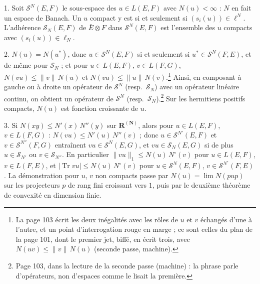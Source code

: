 \documentclass[11pt,a4paper]{article}
\begin{document}
1. Soit $\mathcal{S}^N(E,F)$ le sous-espace des $u \in L(E,F)$ avec $N(u) <
\infty$ : $N$ en fait un espace de Banach. Un $u$ compact y est si et
seulement si $(s_i(u)) \in \ell^N$. L'adhérence $\mathcal{S}_N(E,F)$ de
$\bar{E} \otimes F$ dans $\mathcal{S}^N(E,F)$ est l'ensemble des $u$ compacts
avec $(s_i(u)) \in \ell_N$.

2. $N(u) = N(u^{*})$, donc $u \in \mathcal{S}^N(E,F)$ si et seulement si
$u^{*} \in \mathcal{S}^N(F,E)$, et de même pour $\mathcal{S}_N$ ; et pour
$u \in L(E,F)$, $v \in L(F,G)$, $N(vu) \leq \|v\|\,N(u)$ et $N(vu) \leq
\|u\|\,N(v)$.\footnote{La page 103 écrit les deux inégalités avec les rôles
de $u$ et $v$ échangés d'une à l'autre, et un point d'interrogation rouge en
marge ; ce sont celles du plan de la page 101, dont le premier jet, biffé,
en écrit trois, avec $N(uv) \leq \|v\|\,N(u)$ (seconde passe, machine).}
Ainsi, en composant à gauche ou à droite un opérateur de
$\mathcal{S}^N$ (resp.\ $\mathcal{S}_N$) avec un opérateur linéaire continu,
on obtient un opérateur de $\mathcal{S}^N$ (resp.\ $\mathcal{S}_N$).\footnote{Page
103, dans la lecture de la seconde passe (machine) : la phrase parle
d'opérateurs, non d'espaces comme le lisait la première.} Sur les
hermitiens positifs compacts, $N(u)$ est fonction croissante de $u$.

3. Si $N(xy) \leq N'(x)\,N''(y)$ sur $\mathbf{R}^{(\mathbf{N})}$, alors pour
$u \in L(E,F)$, $v \in L(F,G)$ : $N(vu) \leq N'(u)\,N''(v)$ ; donc $u \in
\mathcal{S}^{N'}(E,F)$ et $v \in \mathcal{S}^{N''}(F,G)$ entraînent $vu \in
\mathcal{S}^N(E,G)$, et $vu \in \mathcal{S}_N(E,G)$ si de plus $u \in
\mathcal{S}_{N'}$ ou $v \in \mathcal{S}_{N''}$. En particulier $\|vu\|_1 \leq
N(u)\,N^{\circ}(v)$ pour $u \in L(E,F)$, $v \in L(F,E)$, et $|\operatorname{Tr}
vu| \leq N(u)\,N^{\circ}(v)$ pour $u \in \mathcal{S}^N(E,F)$, $v \in
\mathcal{S}^{N^{\circ}}(F,E)$. La démonstration pour $u$, $v$ non compacts
passe par $N(u) = \lim N(pup)$ sur les projecteurs $p$ de rang fini croissant
vers $1$, puis par le deuxième théorème de convexité en dimension finie.
\end{document}
